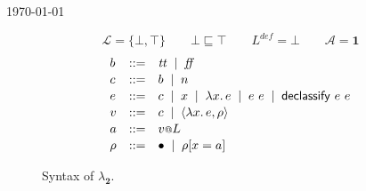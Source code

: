 \documentclass{article}
\makeatletter
\theoremstyle{definition}
\newcommand{\at}{\ensuremath{{\scriptstyle{@}}}}
\makeatother
\begin{document}
\begin{flushright}
  \today
\end{flushright}

\begin{figure}[ht]
  \centering
  \[
  \mathcal{L} = \{ \bot, \top \}
  \qquad
  \bot \sqsubseteq \top
  \qquad
  L^{\mathit{def}} = \bot
  \qquad
  \mathcal{A} = \mathbf{1}
  \]
  \[
  \begin{array}[t]{lcl}
    b & ::= &
    \mathit{tt}\;\; |\;\;
    \mathit{ff}
    \\[0.3ex]
    c & :: = &
    b\;\; |\;\;
    n
    \\[0.3ex]
    e & ::= &
    c\;\; |\;\;
    x\;\; |\;\;
    \lambda{x}.\, e\;\; |\;\;
    e\ e\;\; |\;\;
    \mathsf{declassify}\ e\ e
    \\[0.3ex]
    v & ::= &
    c\;\; |\;\;
    \langle{\lambda{x}.\, e, \rho\rangle}
    \\[0.3ex]
    a & ::= &
    v \at L
    \\[0.3ex]
    \rho & ::= &
    \bullet\;\; |\;\;
    \rho[x = a]
  \end{array}
  \]
  \caption{Syntax of $\lambda_{\mathbf{2}}$.}
  \label{fig:syntax}
\end{figure}
\end{document}

